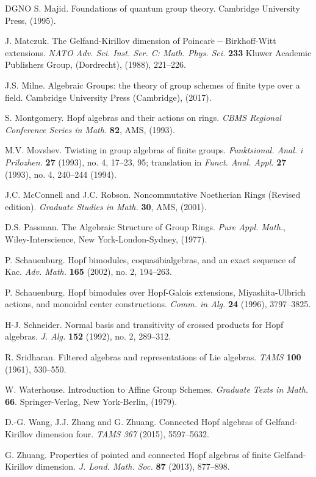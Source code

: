 \documentclass{amsart}
\numberwithin{equation}{section}
\theoremstyle{definition}
\begin{document}
\begin{thebibliography}{DGNO}
 S. Majid.
Foundations of quantum group theory. Cambridge University Press, (1995).

 J. Matczuk. The Gelfand-Kirillov dimension of Poincar$\acute{\mathrm{e}}-$Birkhoff-Witt extensions. {\em NATO Adv. Sci. Inst. Ser. C: Math. Phys. Sci.} {\bf 233}
Kluwer Academic Publishers Group, (Dordrecht), (1988), 221--226.

 J.S. Milne. Algebraic Groups: the theory of group schemes of finite type over a field. Cambridge University Press (Cambridge), (2017).

 S. Montgomery. Hopf algebras and their actions on rings. \emph{CBMS Regional Conference Series in Math.} {\bf 82}, AMS, (1993).

M.V. Movshev. Twisting in group algebras of finite groups. {\em Funktsional. Anal. i Prilozhen.} {\bf 27} (1993), no. 4, 17--23, 95; translation in {\em Funct. Anal. Appl.} {\bf 27} (1993), no. 4, 240--244 (1994).

 J.C. McConnell and J.C. Robson. Noncommutative Noetherian Rings (Revised edition). \emph{Graduate Studies in Math.} {\bf 30}, AMS, (2001).

 D.S. Passman. The Algebraic Structure of Group Rings. \emph{Pure Appl. Math.}, Wiley-Interscience, New York-London-Sydney, (1977).

 P. Schauenburg. Hopf bimodules, coquasibialgebras, and an exact sequence of Kac. {\em Adv. Math.} {\bf 165} (2002), no. 2, 194--263.

 P. Schauenburg. Hopf bimodules over Hopf-Galois extensions, Miyashita-Ulbrich actions, and monoidal center constructions. {\em Comm. in Alg.} {\bf 24}
(1996), 3797--3825.

 H-J. Schneider. Normal basis and transitivity of crossed products for Hopf algebras. 
{\em J. Alg.} {\bf 152} (1992), no. 2, 289--312.

 R. Sridharan. Filtered algebras and representations of Lie algebras. 
{\em TAMS} {\bf 100} (1961), 530--550.

 W. Waterhouse. Introduction to Affine Group Schemes. \emph{Graduate
Texts in Math.} {\bf 66}. Springer-Verlag, New York-Berlin, (1979).

 D.-G. Wang, J.J. Zhang and G. Zhuang. Connected Hopf algebras of Gelfand-Kirillov dimension four. {\em TAMS} {\em 367} (2015), 5597--5632.

 G. Zhuang. Properties of pointed and connected Hopf algebras of finite Gelfand-Kirillov dimension. {\em J. Lond. Math. Soc.} {\bf 87} (2013), 877--898.
   
\end{thebibliography}
\end{document}
